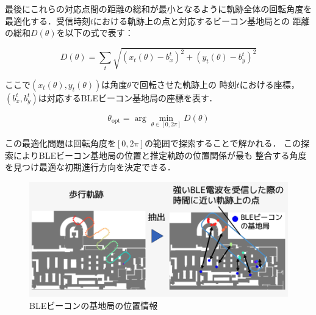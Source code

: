 最後にこれらの対応点間の距離の総和が最小となるように軌跡全体の回転角度を
最適化する．受信時刻$t$における軌跡上の点と対応するビーコン基地局との
距離の総和$D(\theta)$を以下の式で表す：

\begin{equation}
D(\theta) = \sum_{t} \sqrt{(x_t(\theta) - b_x^t)^2 + (y_t(\theta) - b_y^t)^2}
\end{equation}

ここで$(x_t(\theta), y_t(\theta))$は角度$\theta$で回転させた軌跡上の
時刻$t$における座標，$(b_x^t, b_y^t)$は対応するBLEビーコン基地局の座標を表す．

\begin{equation}
\theta_{\mathrm{opt}} = \arg\min_{\theta \in [0, 2\pi]} D(\theta)
\end{equation}

この最適化問題は回転角度を$[0, 2\pi]$の範囲で探索することで解かれる．
この探索によりBLEビーコン基地局の位置と推定軌跡の位置関係が最も
整合する角度を見つけ最適な初期進行方向を決定できる．

\begin{figure}[H]
	\centering
	\includegraphics[width=\linewidth]{image/ble-merge.jpg}
	\caption{BLEビーコンの基地局の位置情報}    \label{fig:ble-merge}
\end{figure}


